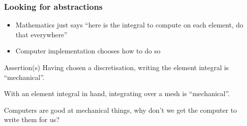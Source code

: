 \documentclass[presentation]{beamer}
\begin{document}
\begin{frame}
  \frametitle{Looking for abstractions}
  \begin{itemize}
  \item Mathematics just says ``here is the integral to compute on each
    element, do that everywhere''
  \item Computer implementation chooses how to do so
  \end{itemize}
  \begin{block}{Assertion(s)}
    Having chosen a discretisation, writing the element integral is ``mechanical''.

    With an element integral in hand, integrating over a mesh is
    ``mechanical''.
  \end{block}

  \begin{corollary}
    Computers are good at mechanical things, why don't we get the
    computer to write them for us?
  \end{corollary}
\end{frame}
\end{document}

